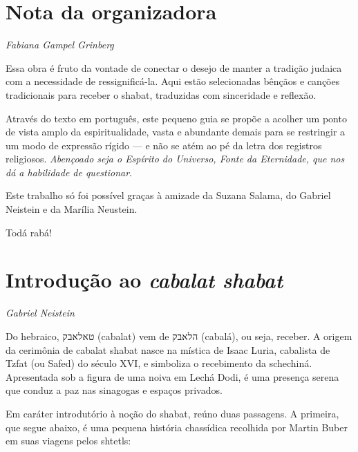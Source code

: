 \chapter*{Nota da organizadora}


\begin{flushright}
\emph{Fabiana Gampel Grinberg}
\end{flushright}

Essa obra é fruto da vontade de conectar o desejo de manter a tradição
judaica com a necessidade de ressignificá-la. Aqui estão selecionadas
bênçãos e canções tradicionais para receber o shabat, traduzidas com
sinceridade e reflexão.

Através do texto em português, este pequeno guia se propõe a acolher um
ponto de vista amplo da espiritualidade, vasta e abundante demais para
se restringir a um modo de expressão rígido --- e não se atém ao pé da
letra dos registros religiosos. \emph{Abençoado seja o Espírito do
Universo, Fonte da Eternidade, que nos dá a habilidade de questionar}.

Este trabalho só foi possível graças à amizade da Suzana Salama, do
Gabriel Neistein e da Marília Neustein.

Todá rabá!

\chapter*{Introdução ao \emph{cabalat shabat}}


\begin{flushright}
\emph{Gabriel Neistein}
\end{flushright}

Do hebraico, טאלאבק (cabalat) vem de הלאבק (cabalá), ou seja, receber. A
origem da cerimônia de cabalat shabat nasce na mística de Isaac Luria,
cabalista de Tzfat (ou Safed) do século XVI, e simboliza o recebimento
da schechiná. Apresentada sob a figura de uma noiva em Lechá Dodi, é uma
presença serena que conduz a paz nas sinagogas e espaços privados.

Em caráter introdutório à noção do shabat, reúno duas passagens. A
primeira, que segue abaixo, é uma pequena história chassídica recolhida
por Martin Buber em suas viagens pelos shtetls:

